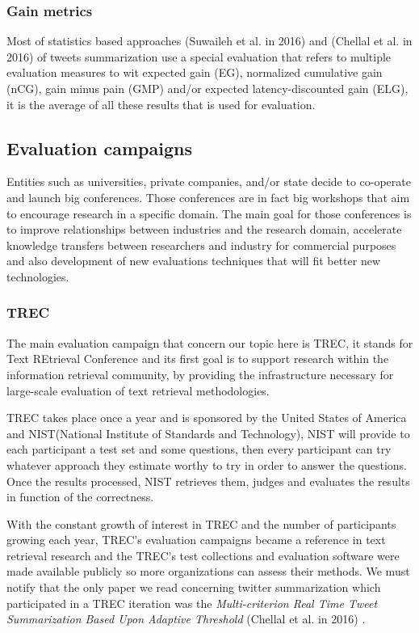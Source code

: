 \documentclass{llncs}
\begin{document}
\subsubsection{Gain metrics}

Most of statistics based approaches (Suwaileh et al. in 2016)
\cite{suwaileh_light-weight_nodate} and (Chellal et al. in 2016)
\cite{chellal_multi-criterion_2016} of tweets summarization use a special
evaluation that refers to multiple evaluation measures to wit expected gain
(EG), normalized cumulative gain (nCG), gain minus pain (GMP) and/or expected
latency-discounted gain (ELG), it is the average of all these results that is
used for evaluation.

\subsection{Evaluation campaigns}

Entities such as universities, private companies, and/or state decide to
co-operate and launch big conferences. Those conferences are in fact big
workshops that aim to encourage research in a specific domain. The main goal
for those conferences is to improve relationships between industries and the
research domain, accelerate knowledge transfers between researchers and
industry for commercial purposes and also development of new evaluations
techniques that will fit better new technologies.

\subsubsection{TREC}

The main evaluation campaign that concern our topic here is TREC, it stands for
Text REtrieval Conference and its first goal is to support research within the
information retrieval community, by providing the infrastructure necessary for
large-scale evaluation of text retrieval methodologies.

TREC takes place once a year and is sponsored by the United States of America
and NIST(National Institute of Standards and Technology), NIST will provide to
each participant a test set and some questions, then every participant can try
whatever approach they estimate worthy to try in order to answer the questions.
Once the results processed, NIST retrieves them, judges and evaluates the
results in function of the correctness.

With the constant growth of interest in TREC and the number of participants
growing each year, TREC's evaluation campaigns became a reference in text
retrieval research and the TREC's test collections and  evaluation software
were made available publicly so more organizations can assess their methods. We
must notify that the only paper we read concerning twitter summarization which
participated in a TREC iteration was the \textit{Multi-criterion Real Time
Tweet Summarization Based Upon Adaptive Threshold} (Chellal et al. in 2016)
\cite{chellal_multi-criterion_2016}.
\end{document}
